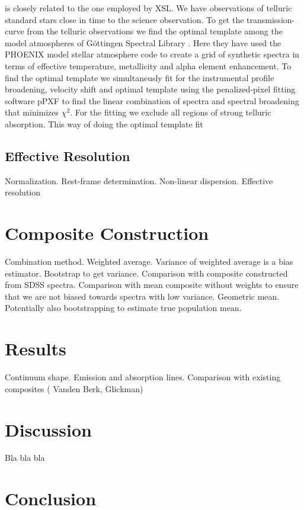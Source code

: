 \documentclass[iop]{emulateapj}
\begin{document}
is closely related to the one employed by XSL. We have observations of telluric standard stars close in time to the science observation. To get the transmission-curve from the telluric observations we find the optimal template among the model atmospheres of Göttingen Spectral Library \cite{Husser2013a}. Here they have used the PHOENIX model stellar atmosphere code to create a grid of synthetic spectra in terms of effective temperature, metallicity and alpha element enhancement. To find the optimal template we simultaneusly fit for the instrumental profile broadening, velocity shift and optimal template using the penalized-pixel fitting software pPXF \cite{Cappellari2014} to find the linear combination of spectra and spectral broadening that minimizes  $ \chi ^2 $. For the fitting we exclude all regions of strong telluric absorption. This way of doing the optimal template fit 




\subsection{Effective Resolution}
Normalization. Rest-frame determination. Non-linear dispersion. Effective resolution

\section{Composite Construction}
Combination method. Weighted average. Variance of weighted average is a bias estimator. Bootstrap to get variance. Comparison with composite constructed from SDSS spectra. Comparison with mean composite without weights to ensure that we are not biased towards spectra with low variance. Geometric mean. Potentially also bootstrapping to estimate true population mean. 
\section{Results}
Continuum shape. Emission and absorption lines. Comparison with existing composites ( Vanden Berk, Glickman)
\section{Discussion}
Bla bla bla
\section{Conclusion}





\end{document}
